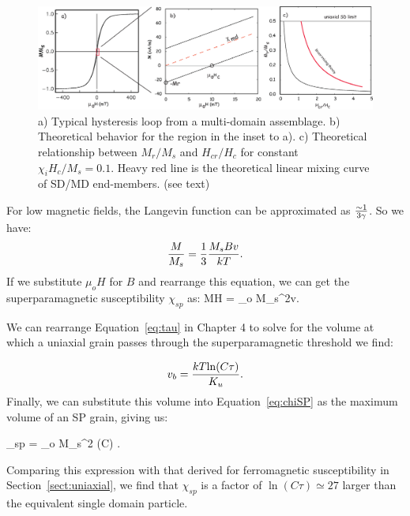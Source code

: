 \begin{figure}[htb]
\centering  \includegraphics[width=14 cm]{EPSfiles/mdloop.eps}
\caption{a) Typical hysteresis loop from a multi-domain assemblage.   b) Theoretical behavior for the region in the inset to a).  c) Theoretical relationship between $M_r/M_s$ and $H_{cr}/H_c$ for constant $\chi_iH_c/M_s = 0.1$.   Heavy red line is the theoretical linear mixing curve of SD/MD end-members.  (see text) }
\label{fig:md}
\end{figure}


For low magnetic fields, the Langevin function can be approximated as $\sim 1\over 3 \gamma$.  So we have:
$$
{M\over {M_s}} = {1\over 3}  { {M_sBv}\over {kT}}.
$$
\noindent   If we substitute $\mu_o H$ for $B$ and rearrange this equation, we can get the superparamagnetic susceptibility $\chi_{sp}$ as:
\beq
{M\over H} =   { {\mu_o M_s^2v}}.
\label{eq:chiSP}
\eeq

\noindent We can rearrange  Equation~\ref{eq:tau} in Chapter 4 to solve for the volume at which a uniaxial grain passes through the superparamagnetic threshold we find:  

$$
{v_b } ={kT{ \ln (C\tau)}\over{K_u}}.
$$
\noindent Finally, we  can substitute this volume into Equation~\ref{eq:chiSP} as the maximum volume of an SP grain, giving us:

\beq
\chi_{sp} = { {\mu_o M_s^2 \ln (C\tau)} }.
\label{eq:chiSP1}
\eeq

\noindent Comparing this expression with that derived for ferromagnetic susceptibility in Section~\ref{sect:uniaxial}, we find that $\chi_{sp}$ is a factor of $\ln(C\tau)\simeq 27$ larger than the equivalent single domain particle.  



